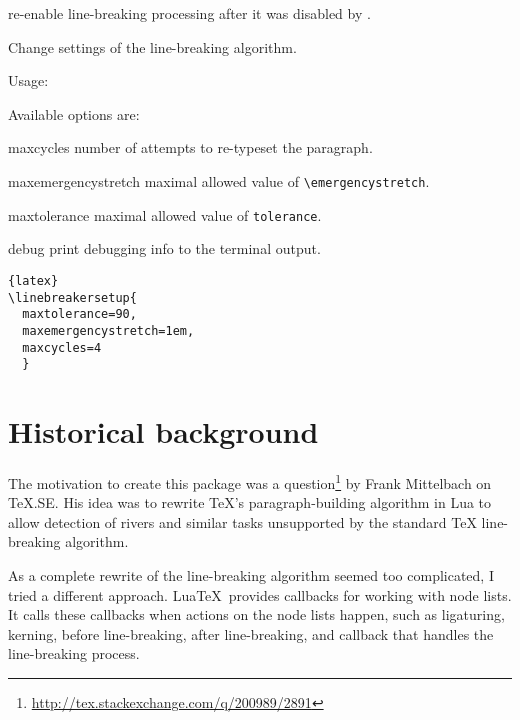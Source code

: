 \documentclass{l3doc}
\begin{document}
\begin{function}{\linebreakerenable}
re-enable line-breaking processing after it was disabled by \cmd{\linebreakerdisable}.
\end{function}

\begin{function}{\linebreakersetup}
  Change settings of the line-breaking algorithm.
  

  \noindent Usage: \cmd{\linebreakersetup}

  \noindent Available options are:
\end{function}

\begin{function}{maxcycles}
number of attempts to re-typeset the paragraph.
\end{function}

\begin{function}{maxemergencystretch}
maximal allowed value of \verb|\emergencystretch|.
\end{function}

\begin{function}{maxtolerance}
maximal allowed value of \verb|tolerance|.
\end{function}

\begin{function}{debug}
print debugging info to the terminal output.
\end{function}


\begin{lstlisting}{latex}
\linebreakersetup{
  maxtolerance=90,
  maxemergencystretch=1em,
  maxcycles=4
  }
\end{lstlisting}



\section{Historical background}

The motivation to create this package was a 
question\footnote{\url{http://tex.stackexchange.com/q/200989/2891}} by Frank Mittelbach on
TeX.SE. His idea was to rewrite TeX’s paragraph-building algorithm in Lua to
allow detection of rivers and similar tasks unsupported by the standard TeX
line-breaking algorithm.

As a complete rewrite of the line-breaking algorithm seemed too complicated, 
I tried a different approach. Lua\TeX\ provides  callbacks for working with node lists. 
It calls these callbacks when actions on the node lists happen, such as 
ligaturing, kerning, before line-breaking, after line-breaking, and 
callback that  handles the line-breaking process. 
\end{document}
